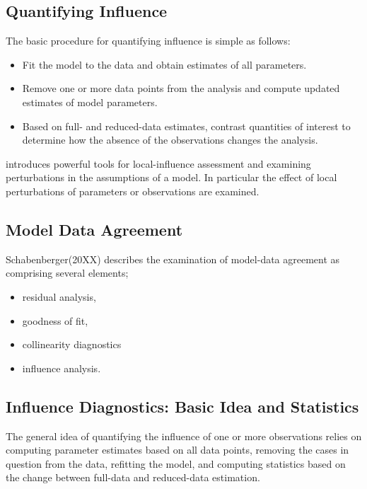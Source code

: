 \documentclass[12pt, a4paper]{article}
\begin{document}
\subsection{Quantifying Influence}  %


The basic procedure for quantifying influence is simple as follows:


\begin{itemize}
	\item Fit the model to the data and obtain estimates of all parameters.
	\item Remove one or more data points from the analysis and compute updated estimates of model parameters.
	\item Based on full- and reduced-data estimates, contrast quantities of interest to determine how the absence of the observations changes the analysis.
\end{itemize}


\citet{cook86} introduces powerful tools for local-influence assessment and examining perturbations in the assumptions of a model. In particular the effect of local perturbations of parameters or observations are examined.







\subsection{Model Data Agreement}
Schabenberger(20XX) describes the examination of model-data agreement as comprising several elements; \begin{itemize}
	\item residual analysis, 
	\item goodness of fit, 
	\item collinearity diagnostics
	\item influence analysis.
\end{itemize}
\subsection{Influence Diagnostics: Basic Idea and Statistics} %

The general idea of quantifying the influence of one or more observations relies on computing parameter estimates based on all data points, removing the cases in question from the data, refitting the model, and computing statistics based on the change between full-data and reduced-data estimation. 
\end{document}
